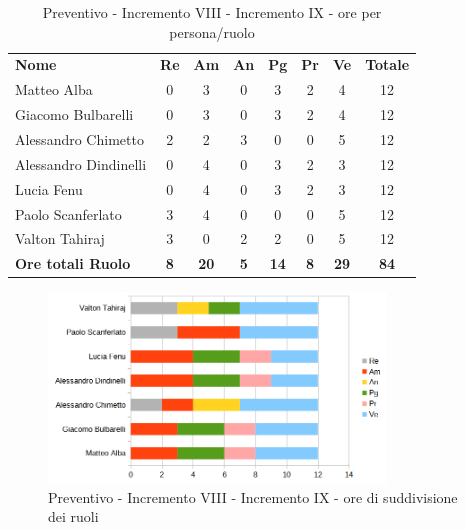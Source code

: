 \begin{table} [h!]
	\begin{center}
		\begin{tabular} { m{3.5cm} c c c c c c c }
			\rowcolor{lightgray}
			\textbf{Nome} & \textbf{Re} & \textbf{Am} & \textbf{An} & \textbf{Pg} & \textbf{Pr} & \textbf{Ve} & \textbf{Totale} \\
			Matteo Alba &0 &3 & 0& 3 &2 & 4 & 12 \\
			Giacomo Bulbarelli & 0&3 & 0& 3 & 2 & 4 & 12 \\
			Alessandro Chimetto & 2 & 2& 3& 0 & 0 & 5& 12 \\
			Alessandro Dindinelli & 0& 4 & 0& 3 & 2 &3 & 12 \\
			Lucia Fenu & 0& 4 & 0& 3 & 2 &3 & 12 \\
			Paolo Scanferlato &3 & 4 &0 & 0 & 0 & 5 & 12\\
			Valton Tahiraj & 3& 0 &2 & 2 & 0 & 5 & 12 \\
			\textbf{Ore totali Ruolo} & \textbf{8} & \textbf{20} & \textbf{5} & \textbf{14} & \textbf{8}& \textbf{29} & \textbf{84}
		\end{tabular}
		\caption{Preventivo - Incremento VIII - Incremento IX - ore per persona/ruolo}
	\end{center}
\end{table}
\begin{figure} [h!]
	\centering
	\includegraphics[width=0.8\textwidth]{res/img/preventivi/8e9-barre.png}
	\caption{Preventivo - Incremento VIII - Incremento IX - ore di suddivisione dei ruoli} 
\end{figure}

\newpage
